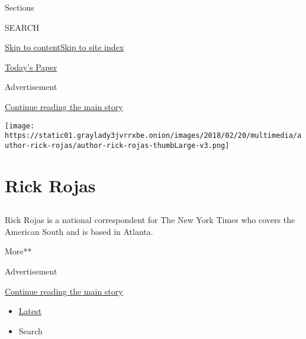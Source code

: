 Sections

SEARCH

\protect\hyperlink{site-content}{Skip to
content}\protect\hyperlink{site-index}{Skip to site index}

\href{https://myaccount.nytimes3xbfgragh.onion/auth/login?response_type=cookie\&client_id=vi}{}

\href{https://www.nytimes3xbfgragh.onion/section/todayspaper}{Today's
Paper}

Advertisement

\protect\hyperlink{after-top}{Continue reading the main story}

\texttt{[image: https://static01.graylady3jvrrxbe.onion/images/2018/02/20/multimedia/author-rick-rojas/author-rick-rojas-thumbLarge-v3.png]}

\hypertarget{rick-rojas}{%
\section{Rick Rojas}\label{rick-rojas}}

\subsection{}

Rick Rojas is a national correspondent for The New York Times who covers
the American South and is based in Atlanta.

More**

Advertisement

\protect\hyperlink{after-mid1}{Continue reading the main story}

\begin{itemize}
\tightlist
\item
  \protect\hyperlink{stream-panel}{Latest}
\item
  Search
\end{itemize}

